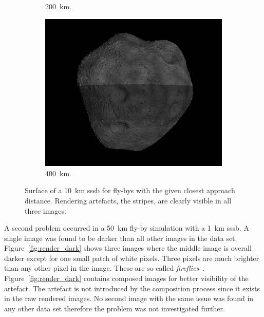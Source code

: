 \begin{figure}[htb]
\begin{subfigure}[b]{0.32\textwidth}
            \caption{\SI{200}{\kilo\meter}.}
            \label{fig:render_artefacts_200}
        \end{subfigure}
        \begin{subfigure}[b]{0.32\textwidth}
            \centering
            \includegraphics[width=\textwidth]{doc/thesis/0_figures/rendering_artefacts/400_10_SssbOnly_2017-08-15T115845-190000.jpg}
            \caption{\SI{400}{\kilo\meter}.}
            \label{fig:render_artefacts_400}
        \end{subfigure}
    \caption{Surface of a \SI{10}{\kilo\meter} \gls{sssb} for fly-bys with the given closest approach distance. Rendering artefacts, the stripes, are clearly visible in all three images.}
    \label{fig:render_artefacts}
\end{figure}

A second problem occurred in a \SI{50}{\kilo\meter} fly-by simulation with a \SI{1}{\kilo\meter} \gls{sssb}. A single image was found to be darker than all other images in the data set. Figure~\ref{fig:render_dark} shows three images where the middle image is overall darker except for one small patch of white pixels. Three pixels are much brighter than any other pixel in the image. These are so-called \textit{fireflies}~\cite{Valenza2015BlenderCookbook}. Figure~\ref{fig:render_dark} contains composed images for better visibility of the artefact. The artefact is not introduced by the composition process since it exists in the raw rendered images. No second image with the same issue was found in any other data set therefore the problem was not investigated further.

